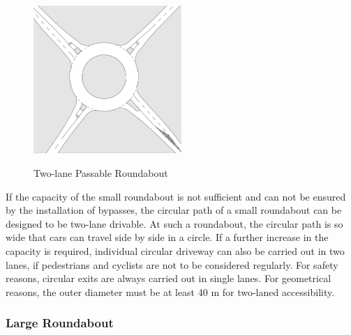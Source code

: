 \begin{figure}[!ht]
\caption{Two-lane Passable Roundabout \cite{man06}}
\includegraphics[width=0.5\textwidth]{bilder/twolaned_roundabout.png} %
\label{roundabout_twolaned}
\end{figure}

%
If the capacity of the small roundabout is not sufficient and can not be ensured by the installation of bypasses,
the circular path of a small roundabout can be designed to be two-lane drivable.
At such a roundabout, the circular path is so wide that cars can travel side by side in a circle.
If a further increase in the capacity is required, individual circular driveway can also be carried out in two lanes, if pedestrians and cyclists are not to be considered regularly.
For safety reasons, circular exits are always carried out in single lanes.
For geometrical reasons, the outer diameter must be at least 40 m for two-laned accessibility.\cite{man06}


\subsubsection{Large Roundabout}


